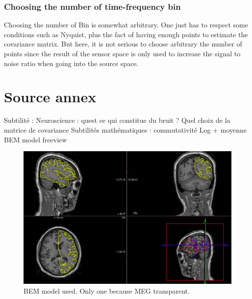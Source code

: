 \subsection{Choosing the number of time-frequency bin}

Choosing the number of Bin is somewhat arbitrary. One just has to respect some conditions such as Nyquist, plus the fact of having enough points to estimate the covariance matrix. But here, it is not serious to choose arbitrary the number of points since the result of the sensor space is only used to increase the signal to noise ratio when going into the source space.

\chapter{Source annex}

Subtilité :
Neuroscience : quest ce qui constitue du bruit ? Quel choix de la matrice de covariance
Subtilités mathématiques :  commutativité Log + moyenne
BEM model freeview



\begin{figure}[ht]
    \centering
    \includegraphics[width=15cm]{images_report/source/BEM_model_freeview_cropped.png}
    \caption[Segemntentation results visualized on Freeview.]%
    {BEM model used. Only one because MEG transparent.}
    \label{BEM_model_freeview_cropped}
\end{figure}
